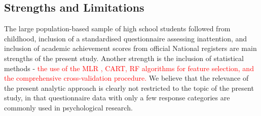 \documentclass[10pt,letterpaper]{article}
\begin{document}
{{%
% 
%

 \subsection*{Strengths and Limitations}
The large population-based sample of high school students followed from childhood, inclusion of a standardised questionnaire assessing inattention, and inclusion of academic achievement scores from official National registers are main strengths of the present study. Another strength is the inclusion of statistical methods - \textcolor{red}{the use of the MLR , CART, RF algorithms for feature selection, and the comprehensive cross-validation procedure.} We believe that the relevance of the present analytic approach is clearly not restricted to the topic of the present study, in that questionnaire data with only a few response categories are commonly used in psychological research. \\

}}
\end{document}
